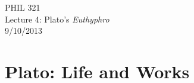 \documentclass[11pt]{article}
\begin{document}
\thispagestyle{empty}
\begin{center} \LARGE{PHIL 321\\ Lecture 4: Plato's \emph{Euthyphro}}\\ \vspace*{2mm}
\large{9/10/2013}\end{center}
\thispagestyle{empty}\vspace*{3mm}

\section*{Plato: Life and Works}
\begin{itemize}


\end{itemize}
\end{document}
